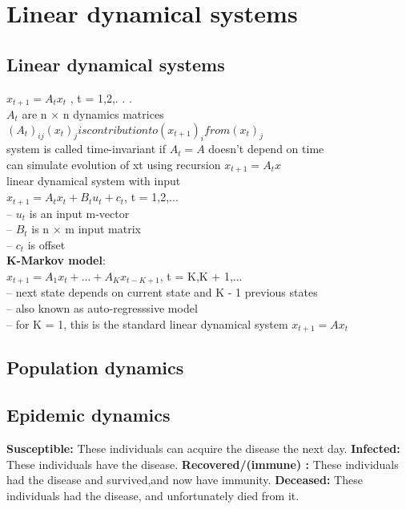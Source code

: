 \section{Linear dynamical systems}
\subsection{Linear dynamical systems}
$x_{t+1} = A_tx_t$ , t = 1,2,. . .\\
\textbullet $A_t$ are n × n dynamics matrices
\textbullet $(A_t)_{ij}(x_t)_j
is contribution to (x_{t+1})_i
from (x_t)_j$\\
\textbullet system is called time-invariant if $A_t = A$ doesn't depend on time\\
\textbullet can simulate evolution of xt using recursion $x_{t+1} = A_tx$\\
\textbullet linear dynamical system with input\\
$x_{t+1} = A_tx_t + B_tu_t + c_t$, t = 1,2,...\\
\thickspace -- $u_t$ is an input m-vector\\
\thickspace -- $B_t$ is n × m input matrix\\
\thickspace -- $c_t$ is offset\\
\textbf{K-Markov model}:\\
$x_{t+1} = A_1x_t + ... + A_Kx_{t-K+1}$, t = K,K + 1,...\\
\thickspace -- next state depends on current state and K - 1 previous states\\
\thickspace – also known as auto-regresssive model\\
\thickspace – for K = 1, this is the standard linear dynamical system $x_{t+1} = Ax_t$\\
\subsection{Population dynamics}

\subsection{Epidemic dynamics}
\textbullet \textbf{Susceptible:} These individuals can acquire the disease the next day. \newline
\textbullet \textbf{Infected:} These individuals have the disease.
\textbullet \textbf{Recovered/(immune) :} These individuals had the disease and survived,and now have immunity. \newline
\textbullet \textbf{Deceased:} These individuals had the disease, and unfortunately died from it.

